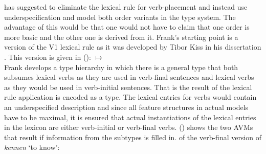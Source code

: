 \begin{exe}
\begin{xlist}
\citet{Frank94} has suggested to eliminate the lexical rule for verb-placement and instead use
underspecification and model both order variants in the type system. The advantage of this would be
that one would not have to claim that one order is more basic and the other one is derived from
it. Frank's starting point is a version of the V1 lexical rule as it was developed by Tibor Kiss in
his dissertation \citep[]{Kiss93}. This version is given in ():
\eas
{}
$\mapsto$\\
\zs
Frank develops a type hierarchy in which there is a general type that both subsumes lexical verbs as
they are used in verb-final sentences and lexical verbs as they would be used in verb-initial
sentences. That is the result of the lexical rule application is encoded as a type. The lexical
entries for verbs would contain an underspecified description and since all feature structures in
actual models have to be maximal, it is ensured that actual instantiations of the lexical entries in
the lexicon are either verb-initial or verb-final verbs. () shows the two AVMs that result if
information from the subtypes is filled in.
\eal
\ex \locv of the verb-final version of \emph{kennen} `to know':\\
\end{xlist}
\end{exe}
